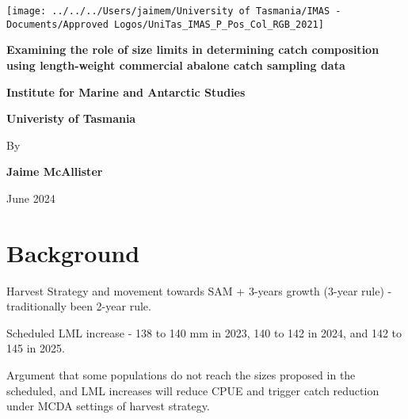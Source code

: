 \documentclass[
  11pt,
]{article}
\author{}
\date{\vspace{-2.5em}}
\begin{document}
\subsectionfont{\raggedright}
\subsubsectionfont{\raggedright}


\begin{centering}

\vspace{3cm}


\begin{center}\texttt{[image: ../../../Users/jaimem/University of Tasmania/IMAS - Documents/Approved Logos/UniTas\_IMAS\_P\_Pos\_Col\_RGB\_2021]} \end{center}

\vspace{4cm}

\LARGE

\doublespacing
{\bf Examining the role of size limits in determining catch composition using length-weight commercial abalone catch sampling data}

\vspace{4 cm}

\Large
{\bf Institute for Marine and Antarctic Studies}

\Large
{\bf Univeristy of Tasmania}

\vspace{1cm}

\normalsize
\singlespacing
By

\vspace{0.5 cm}

\large

{\bf Jaime McAllister}

\vspace{1.5 cm}

\normalsize
June 2024

\end{centering}

\newpage

\section{Background}\label{background}

Harvest Strategy and movement towards SAM + 3-years growth (3-year rule)
- traditionally been 2-year rule.

Scheduled LML increase - 138 to 140 mm in 2023, 140 to 142 in 2024, and
142 to 145 in 2025.

Argument that some populations do not reach the sizes proposed in the
scheduled, and LML increases will reduce CPUE and trigger catch
reduction under MCDA settings of harvest strategy.
\end{document}
